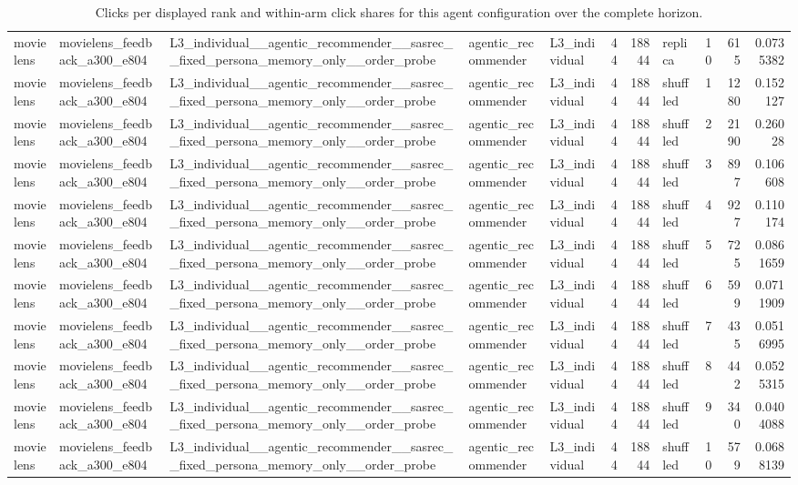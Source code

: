 \begin{table}[htbp!]
\begin{tabular}{lllllrrlrrr}
movielens & movielens\_feedback\_a300\_e804 & L3\_individual\_\_agentic\_recommender\_\_sasrec\_\_fixed\_persona\_memory\_only\_\_order\_probe & agentic\_recommender & L3\_individual & 44 & 18844 & replica & 10 & 615 & 0.0735382 \\
movielens & movielens\_feedback\_a300\_e804 & L3\_individual\_\_agentic\_recommender\_\_sasrec\_\_fixed\_persona\_memory\_only\_\_order\_probe & agentic\_recommender & L3\_individual & 44 & 18844 & shuffled & 1 & 1280 & 0.152127 \\
movielens & movielens\_feedback\_a300\_e804 & L3\_individual\_\_agentic\_recommender\_\_sasrec\_\_fixed\_persona\_memory\_only\_\_order\_probe & agentic\_recommender & L3\_individual & 44 & 18844 & shuffled & 2 & 2190 & 0.26028 \\
movielens & movielens\_feedback\_a300\_e804 & L3\_individual\_\_agentic\_recommender\_\_sasrec\_\_fixed\_persona\_memory\_only\_\_order\_probe & agentic\_recommender & L3\_individual & 44 & 18844 & shuffled & 3 & 897 & 0.106608 \\
movielens & movielens\_feedback\_a300\_e804 & L3\_individual\_\_agentic\_recommender\_\_sasrec\_\_fixed\_persona\_memory\_only\_\_order\_probe & agentic\_recommender & L3\_individual & 44 & 18844 & shuffled & 4 & 927 & 0.110174 \\
movielens & movielens\_feedback\_a300\_e804 & L3\_individual\_\_agentic\_recommender\_\_sasrec\_\_fixed\_persona\_memory\_only\_\_order\_probe & agentic\_recommender & L3\_individual & 44 & 18844 & shuffled & 5 & 725 & 0.0861659 \\
movielens & movielens\_feedback\_a300\_e804 & L3\_individual\_\_agentic\_recommender\_\_sasrec\_\_fixed\_persona\_memory\_only\_\_order\_probe & agentic\_recommender & L3\_individual & 44 & 18844 & shuffled & 6 & 599 & 0.0711909 \\
movielens & movielens\_feedback\_a300\_e804 & L3\_individual\_\_agentic\_recommender\_\_sasrec\_\_fixed\_persona\_memory\_only\_\_order\_probe & agentic\_recommender & L3\_individual & 44 & 18844 & shuffled & 7 & 435 & 0.0516995 \\
movielens & movielens\_feedback\_a300\_e804 & L3\_individual\_\_agentic\_recommender\_\_sasrec\_\_fixed\_persona\_memory\_only\_\_order\_probe & agentic\_recommender & L3\_individual & 44 & 18844 & shuffled & 8 & 442 & 0.0525315 \\
movielens & movielens\_feedback\_a300\_e804 & L3\_individual\_\_agentic\_recommender\_\_sasrec\_\_fixed\_persona\_memory\_only\_\_order\_probe & agentic\_recommender & L3\_individual & 44 & 18844 & shuffled & 9 & 340 & 0.0404088 \\
movielens & movielens\_feedback\_a300\_e804 & L3\_individual\_\_agentic\_recommender\_\_sasrec\_\_fixed\_persona\_memory\_only\_\_order\_probe & agentic\_recommender & L3\_individual & 44 & 18844 & shuffled & 10 & 579 & 0.0688139 \\
\hline
\end{tabular}
\caption{Clicks per displayed rank and within-arm click shares for this agent configuration over the complete horizon.}
\label{chap:results:tab:rq3_rank_counts_l3_individual_agentic_recommender_sasrec_fixed_persona_memory_only_order_probe}
\end{table}
